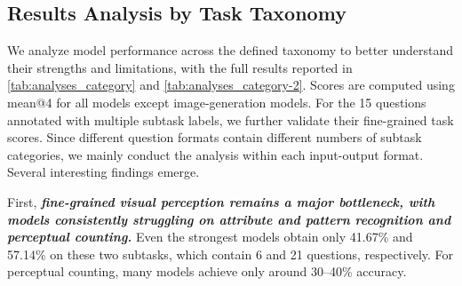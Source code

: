 \subsection{Results Analysis by Task Taxonomy}

We analyze model performance across the defined taxonomy to better understand  their strengths and limitations, with the full results reported in  \autoref{tab:analyses_category} and \autoref{tab:analyses_category-2}. Scores are computed using mean@4 for all models  except image-generation models. For the 15 questions annotated with multiple subtask labels, we further validate their fine-grained task scores. Since different question formats contain different numbers of subtask categories, we mainly conduct the 
analysis within each input-output format. Several interesting findings emerge. 



First, \textbf{\emph{fine-grained visual perception remains a major bottleneck, with models consistently struggling on attribute and pattern recognition and perceptual counting.}} Even the strongest models obtain only 41.67\%  and 57.14\% on these two subtasks, which contain 6 and 21 questions, respectively. For perceptual counting, many models achieve only around 30--40\% accuracy. 

